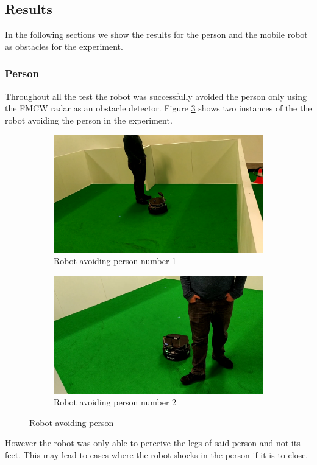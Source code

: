 \subsection{Results}
In the following sections we show the results for the person and the mobile robot as obstacles for the experiment.
\subsubsection{Person}
Throughout all the test the robot was successfully avoided the person  only using the \ac{FMCW} \ac{radar} as an obstacle detector. Figure \ref{fig:exp3person} shows two instances of the the robot avoiding the person in the experiment.
\begin{figure}[ht!]
  \centering
  \begin{subfigure}[b]{0.49\linewidth}
    \includegraphics[width=\linewidth]{imgs/chapter5/exp3person1.png}
     \caption{Robot avoiding person number 1}
     \label{fig::exp3person1}
  \end{subfigure}
  \begin{subfigure}[b]{0.49\linewidth}
    \includegraphics[width=\linewidth]{imgs/chapter5/exp3person2.png}
    \caption{Robot avoiding person  number 2}
    \label{fig::exp3person2}
  \end{subfigure}
  \caption{Robot avoiding person }
  \label{fig:exp3person}
\end{figure}
However the robot was only able to perceive the legs of said person and not its feet. This may lead to cases where the robot shocks in the person if it is to close.

